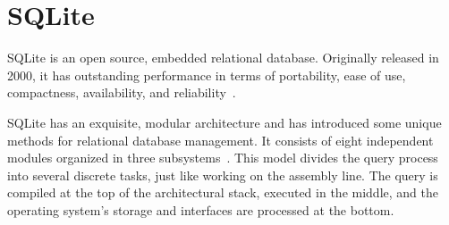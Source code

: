 \section{SQLite}

SQLite is an open source, embedded relational database. Originally 
released in 2000, it has outstanding performance in terms of 
portability, ease of use, compactness, availability, and 
reliability~\cite{www-sqlite}.

SQLite has an exquisite, modular architecture and has introduced 
some unique methods for relational database management. It consists
of eight independent modules organized in three subsystems~\cite{www-sqlite-archi}.
This model divides the query process into several discrete tasks, 
just like working on the assembly line. The query is compiled at 
the top of the architectural stack, executed in the middle, and the
operating system's storage and interfaces are processed at the bottom.
